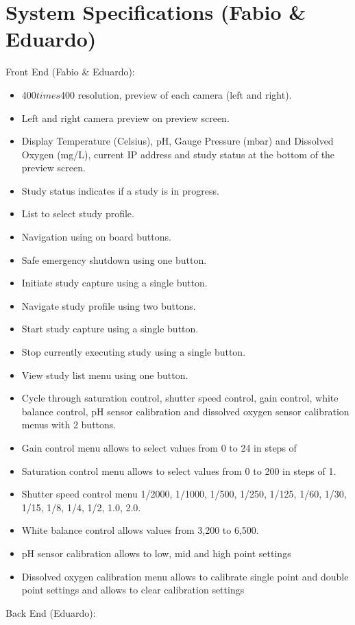 \section{System Specifications (Fabio \& Eduardo)}
Front End (Fabio \& Eduardo):
\begin{itemize}
	\item 400$times$400 resolution, preview of each camera (left and right).
	\item Left and right camera preview on preview screen.
	\item Display Temperature (Celsius), pH, Gauge Pressure (mbar) and Dissolved Oxygen (mg/L), current IP address and study status at the bottom of the preview screen.
	\item Study status indicates if a study is in progress.
	\item List to select study profile.
	\item Navigation using on board buttons.
	\item Safe emergency shutdown using one button.
	\item Initiate study capture using a single button.
	\item Navigate study profile using two buttons.
	\item Start study capture using a single button.
	\item Stop currently executing study using a single button.
	\item View study list menu using one button.
	\item Cycle through saturation control, shutter speed control, gain control, white balance control, pH sensor calibration and dissolved oxygen sensor calibration menus with 2 buttons.
	\item Gain control menu allows to select values from 0 to 24 in steps of
	\item Saturation control menu allows to select values from 0 to 200 in steps of 1.
	\item Shutter speed control menu 1/2000, 1/1000, 1/500, 1/250, 1/125, 1/60, 1/30, 1/15, 1/8, 1/4, 1/2, 1.0, 2.0.
	\item White balance control allows values from 3,200 to 6,500.
	\item pH sensor calibration allows to low, mid and high point settings
	\item Dissolved oxygen calibration menu allows to calibrate single point and double point settings and allows to clear calibration settings
\end{itemize}
Back End (Eduardo):
